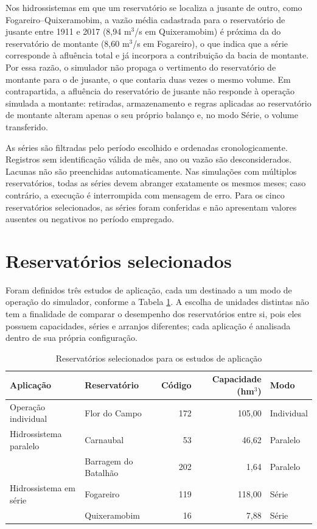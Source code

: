 Nos hidrossistemas em que um reservatório se localiza a jusante de outro, como Fogareiro--Quixeramobim, a vazão média cadastrada para o reservatório de jusante entre 1911 e 2017 (8,94 m$^3$/s em Quixeramobim) é próxima da do reservatório de montante (8,60 m$^3$/s em Fogareiro), o que indica que a série corresponde à afluência total e já incorpora a contribuição da bacia de montante. Por essa razão, o simulador não propaga o vertimento do reservatório de montante para o de jusante, o que contaria duas vezes o mesmo volume. Em contrapartida, a afluência do reservatório de jusante não responde à operação simulada a montante: retiradas, armazenamento e regras aplicadas ao reservatório de montante alteram apenas o seu próprio balanço e, no modo Série, o volume transferido.

As séries são filtradas pelo período escolhido e ordenadas cronologicamente. Registros sem identificação válida de mês, ano ou vazão são desconsiderados. Lacunas não são preenchidas automaticamente. Nas simulações com múltiplos reservatórios, todas as séries devem abranger exatamente os mesmos meses; caso contrário, a execução é interrompida com mensagem de erro. Para os cinco reservatórios selecionados, as séries foram conferidas e não apresentam valores ausentes ou negativos no período empregado.

\section{Reservatórios selecionados}
\label{sec:reservatorios-selecionados}

Foram definidos três estudos de aplicação, cada um destinado a um modo de operação do simulador, conforme a Tabela \ref{tab:reservatorios-selecionados}. A escolha de unidades distintas não tem a finalidade de comparar o desempenho dos reservatórios entre si, pois eles possuem capacidades, séries e arranjos diferentes; cada aplicação é analisada dentro de sua própria configuração.

\begin{table}[!htbp]
    \captionsetup{width=15cm}
    \caption{Reservatórios selecionados para os estudos de aplicação}
    \label{tab:reservatorios-selecionados}
    \centering
    \small
    \begin{tabular}{p{4.2cm}p{3.6cm}rrp{2.0cm}}
        \toprule
        Aplicação & Reservatório & Código & Capacidade (hm$^3$) & Modo \\
        \midrule
        Operação individual & Flor do Campo & 172 & 105,00 & Individual \\
        Hidrossistema paralelo & Carnaubal & 53 & 46,62 & Paralelo \\
         & Barragem do Batalhão & 202 & 1,64 & Paralelo \\
        Hidrossistema em série & Fogareiro & 119 & 118,00 & Série \\
         & Quixeramobim & 16 & 7,88 & Série \\
        \bottomrule
    \end{tabular}
\end{table}


